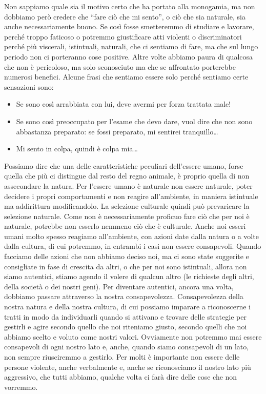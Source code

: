 \documentclass[12pt]{book} %
\begin{document}
Non sappiamo quale sia il motivo certo che ha portato alla monogamia, ma non dobbiamo però
credere che “fare ciò che mi sento”, o ciò che sia naturale, sia anche necessariamente buono. Se
così fosse smetteremmo di studiare e lavorare, perché troppo faticoso o potremmo giustificare atti violenti o
discriminatori perché più viscerali, istintuali, naturali, che ci sentiamo di fare,
ma che sul lungo periodo non ci porteranno cose positive. Altre volte abbiamo paura di qualcosa che non è
pericoloso, ma solo sconosciuto ma che se affrontato porterebbe numerosi benefici. 
Alcune frasi che sentiamo essere solo perché sentiamo certe sensazioni sono:
\begin{itemize}
\item Se sono così arrabbiata con lui, deve avermi per forza trattata male! 
\item Se sono così preoccupato per l'esame che devo dare, vuol dire che non sono abbastanza preparato: se fossi preparato, mi sentirei tranquillo…
\item Mi sento in colpa, quindi è colpa mia…
\end{itemize}

Possiamo dire che una delle caratteristiche peculiari dell'essere umano, forse quella che più ci
distingue dal resto del regno animale, è proprio quella di non assecondare la natura. Per l'essere
umano è naturale non essere naturale, poter decidere i propri comportamenti e non reagire
all'ambiente, in maniera istintuale ma addirittura modificandolo. La selezione culturale quindi
può prevaricare la selezione naturale. Come non è necessariamente proficuo fare ciò che per noi è naturale, potrebbe non esserlo
nemmeno ciò che è culturale. Anche noi esseri umani molto spesso reagiamo
all'ambiente, con azioni date dalla natura o a volte dalla cultura, di cui potremmo, in entrambi i
casi non essere consapevoli. Quando facciamo delle azioni che non abbiamo deciso noi, ma ci sono state suggerite e
consigliate in fase di crescita da altri, o che per noi sono istintuali, allora non siamo autentici, stiamo agendo il
volere di qualcun altro (le richieste degli altri, della società o dei nostri geni). Per diventare autentici, ancora
una volta, dobbiamo passare attraverso la nostra consapevolezza. Consapevolezza della nostra natura e della nostra
cultura, di cui possiamo imparare a riconoscerne i tratti
in modo da individuarli quando si attivano e trovare delle strategie per gestirli e agire secondo quello
che noi riteniamo giusto, secondo quelli che noi abbiamo scelto e voluto come nostri valori. Ovviamente non potremmo
mai essere consapevoli di ogni nostro lato e, anche, quando siamo consapevoli di un lato, non sempre riusciremmo a gestirlo. Per
molti è importante non essere delle persone violente, anche verbalmente e, anche se riconosciamo il nostro lato
più aggressivo, che tutti abbiamo, qualche volta ci farà dire delle cose che non vorremmo.
\end{document}
